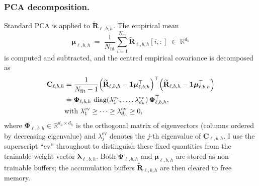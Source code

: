 \vspace{-6pt}
\subsubsection{PCA decomposition.}
Standard PCA is applied to $\widetilde{\mathbf{R}}_{\ell,b,h}$.
The empirical mean
\begin{equation}
    \boldsymbol{\mu}_{\ell,b,h}
    \;=\; \frac{1}{N_{\mathrm{fit}}}
          \sum_{i=1}^{N_{\mathrm{fit}}}
          \widetilde{\mathbf{R}}_{\ell,b,h}[i,:]
    \;\in\; \mathbb{R}^{d_h}
\end{equation}
is computed and subtracted, and the centred empirical covariance is
decomposed as
\begin{align}
    \mathbf{C}_{\ell,b,h}
    &= \frac{1}{N_{\mathrm{fit}} - 1}
       \Bigl(\widetilde{\mathbf{R}}_{\ell,b,h}
             - \mathbf{1}\boldsymbol{\mu}_{\ell,b,h}^\top\Bigr)^\top
       \Bigl(\widetilde{\mathbf{R}}_{\ell,b,h}
             - \mathbf{1}\boldsymbol{\mu}_{\ell,b,h}^\top\Bigr) \notag \\
    &= \boldsymbol{\Phi}_{\ell,b,h}\,
       \operatorname{diag}(\lambda^{\mathrm{ev}}_1, \ldots,
                            \lambda^{\mathrm{ev}}_{d_h})\,
       \boldsymbol{\Phi}_{\ell,b,h}^\top,
    \label{eq:pca_decomp}
       \\
    &\text{with }\lambda^{\mathrm{ev}}_1 \ge \cdots \ge
    \lambda^{\mathrm{ev}}_{d_h} \ge 0,
\end{align}
where $\boldsymbol{\Phi}_{\ell,b,h} \in \mathbb{R}^{d_h \times d_h}$ is
the orthogonal matrix of eigenvectors (columns ordered by decreasing
eigenvalue) and $\lambda^{\mathrm{ev}}_j$ denotes the $j$-th eigenvalue
of $\mathbf{C}_{\ell,b,h}$. I use the superscript ``ev'' throughout to
distinguish these fixed quantities from the trainable weight vector
$\boldsymbol{\lambda}_{\ell,b,h}$.
Both $\boldsymbol{\Phi}_{\ell,b,h}$ and $\boldsymbol{\mu}_{\ell,b,h}$
are stored as non-trainable buffers; the accumulation buffers
$\widetilde{\mathbf{R}}_{\ell,b,h}$ are then cleared to free memory.

